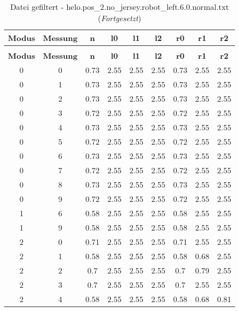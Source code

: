 \begin{longtable}{|c|c||c||c|c|c||c|c|c|}
	\caption{Datei gefiltert - helo.pos\_2.no\_jersey.robot\_left.6.0.normal.txt} \label{tab:helo.pos-2.no-jersey.robot-left.6.0.normal.txt} \\ \hline
	\textbf{Modus} & \textbf{Messung} & \textbf{n} & \textbf{l0} & \textbf{l1} & \textbf{l2} & \textbf{r0} & \textbf{r1} & \textbf{r2}\\ \hline
	\endfirsthead
	\caption[]{Datei gefiltert - helo.pos\_2.no\_jersey.robot\_left.6.0.normal.txt (\emph{Fortgesetzt})} \\ \hline
	\textbf{Modus} & \textbf{Messung} & \textbf{n} & \textbf{l0} & \textbf{l1} & \textbf{l2} & \textbf{r0} & \textbf{r1} & \textbf{r2}\\ \hline
	\endhead
	0 & 0 & 0.73 & 2.55 & 2.55 & 2.55 & 0.73 & 2.55 & 2.55 \\ \hline
	0 & 1 & 0.73 & 2.55 & 2.55 & 2.55 & 0.73 & 2.55 & 2.55 \\ \hline
	0 & 2 & 0.73 & 2.55 & 2.55 & 2.55 & 0.73 & 2.55 & 2.55 \\ \hline
	0 & 3 & 0.72 & 2.55 & 2.55 & 2.55 & 0.72 & 2.55 & 2.55 \\ \hline
	0 & 4 & 0.73 & 2.55 & 2.55 & 2.55 & 0.73 & 2.55 & 2.55 \\ \hline
	0 & 5 & 0.72 & 2.55 & 2.55 & 2.55 & 0.72 & 2.55 & 2.55 \\ \hline
	0 & 6 & 0.73 & 2.55 & 2.55 & 2.55 & 0.73 & 2.55 & 2.55 \\ \hline
	0 & 7 & 0.72 & 2.55 & 2.55 & 2.55 & 0.72 & 2.55 & 2.55 \\ \hline
	0 & 8 & 0.73 & 2.55 & 2.55 & 2.55 & 0.73 & 2.55 & 2.55 \\ \hline
	0 & 9 & 0.72 & 2.55 & 2.55 & 2.55 & 0.72 & 2.55 & 2.55 \\ \hline
	1 & 6 & 0.58 & 2.55 & 2.55 & 2.55 & 0.58 & 2.55 & 2.55 \\ \hline
	1 & 9 & 0.58 & 2.55 & 2.55 & 2.55 & 0.58 & 2.55 & 2.55 \\ \hline
	2 & 0 & 0.71 & 2.55 & 2.55 & 2.55 & 0.71 & 2.55 & 2.55 \\ \hline
	2 & 1 & 0.58 & 2.55 & 2.55 & 2.55 & 0.58 & 0.68 & 2.55 \\ \hline
	2 & 2 & 0.7 & 2.55 & 2.55 & 2.55 & 0.7 & 0.79 & 2.55 \\ \hline
	2 & 3 & 0.7 & 2.55 & 2.55 & 2.55 & 0.7 & 2.55 & 2.55 \\ \hline
	2 & 4 & 0.58 & 2.55 & 2.55 & 2.55 & 0.58 & 0.68 & 0.81 \\ \hline

\end{longtable}
